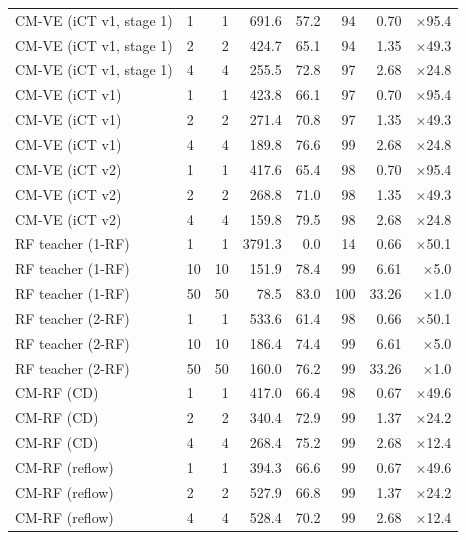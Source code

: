 \documentclass{article}
\begin{document}
\begin{table}[H]
\begin{tabular}{llrrrrrr}
    \midrule
    CM-VE (iCT v1, stage 1) & 1 & 1 & 691.6 & 57.2 & 94 & 0.70 & $\times$95.4 \\
    CM-VE (iCT v1, stage 1) & 2 & 2 & 424.7 & 65.1 & 94 & 1.35 & $\times$49.3 \\
    CM-VE (iCT v1, stage 1) & 4 & 4 & 255.5 & 72.8 & 97 & 2.68 & $\times$24.8 \\
    \midrule
    CM-VE (iCT v1) & 1 & 1 & 423.8 & 66.1 & 97 & 0.70 & $\times$95.4 \\
    CM-VE (iCT v1) & 2 & 2 & 271.4 & 70.8 & 97 & 1.35 & $\times$49.3 \\
    CM-VE (iCT v1) & 4 & 4 & 189.8 & 76.6 & 99 & 2.68 & $\times$24.8 \\
    \midrule
    CM-VE (iCT v2) & 1 & 1 & 417.6 & 65.4 & 98 & 0.70 & $\times$95.4 \\
    CM-VE (iCT v2) & 2 & 2 & 268.8 & 71.0 & 98 & 1.35 & $\times$49.3 \\
    CM-VE (iCT v2) & 4 & 4 & 159.8 & 79.5 & 98 & 2.68 & $\times$24.8 \\
    \midrule
    RF teacher (1-RF) & 1 & 1 & 3791.3 & 0.0 & 14 & 0.66 & $\times$50.1 \\
    RF teacher (1-RF) & 10 & 10 & 151.9 & 78.4 & 99 & 6.61 & $\times$5.0 \\
    RF teacher (1-RF) & 50 & 50 & 78.5 & 83.0 & 100 & 33.26 & $\times$1.0 \\
    RF teacher (2-RF) & 1 & 1 & 533.6 & 61.4 & 98 & 0.66 & $\times$50.1 \\
    RF teacher (2-RF) & 10 & 10 & 186.4 & 74.4 & 99 & 6.61 & $\times$5.0 \\
    RF teacher (2-RF) & 50 & 50 & 160.0 & 76.2 & 99 & 33.26 & $\times$1.0 \\
    \midrule
    CM-RF (CD) & 1 & 1 & 417.0 & 66.4 & 98 & 0.67 & $\times$49.6 \\
    CM-RF (CD) & 2 & 2 & 340.4 & 72.9 & 99 & 1.37 & $\times$24.2 \\
    CM-RF (CD) & 4 & 4 & 268.4 & 75.2 & 99 & 2.68 & $\times$12.4 \\
    \midrule
    CM-RF (reflow) & 1 & 1 & 394.3 & 66.6 & 99 & 0.67 & $\times$49.6 \\
    CM-RF (reflow) & 2 & 2 & 527.9 & 66.8 & 99 & 1.37 & $\times$24.2 \\
    CM-RF (reflow) & 4 & 4 & 528.4 & 70.2 & 99 & 2.68 & $\times$12.4 \\
    \bottomrule
  \end{tabular}
\end{table}
\end{document}
